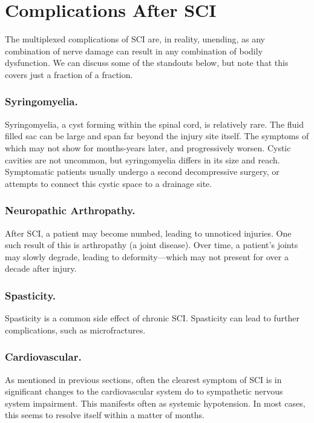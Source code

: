 \section{Complications After SCI}

The multiplexed complications of SCI are, in reality, unending, as any combination of nerve damage can result in any combination of bodily dysfunction. We can discuss some of the standouts below, but note that this covers just a fraction of a fraction. 

\subsubsection{Syringomyelia.}
Syringomyelia, a cyst forming within the spinal cord, is relatively rare. The fluid filled sac can be large and span far beyond the injury site itself. The symptoms of which may not show for months-years later, and progressively worsen. Cystic cavities are not uncommon, but syringomyelia differs in its size and reach. Symptomatic patients usually undergo a second decompressive surgery, or attempts to connect this cystic space to a drainage site. 

\subsubsection{Neuropathic Arthropathy.}
After SCI, a patient may become numbed, leading to unnoticed injuries. One such result of this is arthropathy (a joint disease). Over time, a patient's joints may slowly degrade, leading to deformity---which may not present for over a decade after injury. 

\subsubsection{Spasticity.}
Spasticity is a common side effect of chronic SCI. Spasticity can lead to further complications, such as microfractures. 

\subsubsection{Cardiovascular.}
As mentioned in previous sections, often the clearest symptom of SCI is in significant changes to the cardiovascular system do to sympathetic nervous system impairment. This manifests often as systemic hypotension. In most cases, this seems to resolve itself within a matter of months. 


